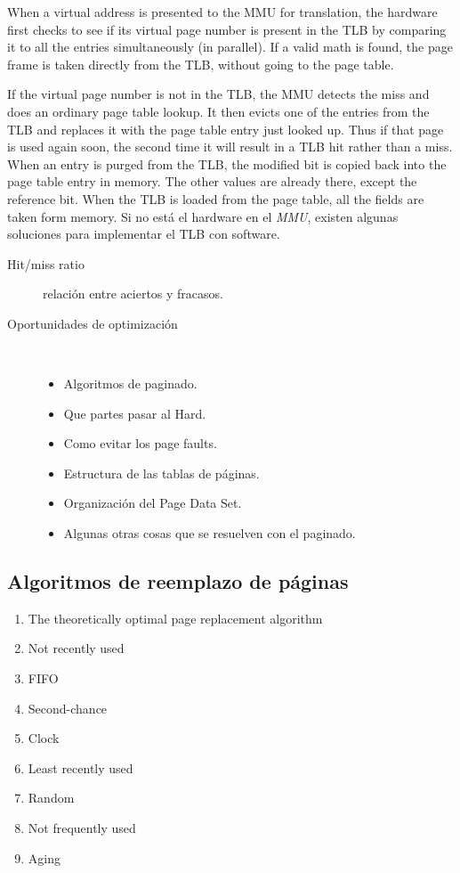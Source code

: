 \documentclass[a4paper, twoside]{article}
\begin{document}
When a virtual address is presented to the MMU for translation, the hardware first checks to see if its virtual page number is present in the TLB by comparing it to all the entries simultaneously (in parallel). If a valid math is found, the page frame is taken directly from the TLB, without going to the page table.

If the virtual page number is not in the TLB, the MMU detects the miss and does an ordinary page table lookup. It then evicts one of the entries from the TLB and replaces it with the page table entry just looked up. Thus if that page is used again soon, the second time it will result in a TLB hit rather than a miss. When an entry is purged from the TLB, the modified bit is copied back into the page table entry in memory. The other values are already there, except the reference bit. When the TLB is loaded from the page table, all the fields are taken form memory.
Si no está el hardware en el \emph{MMU}, existen algunas soluciones para implementar el TLB con software.

\begin{description}
	\item[Hit/miss ratio] relación entre aciertos y fracasos.
	\item[Oportunidades de optimización] ~
	\begin{itemize}
		\item Algoritmos de paginado. 
		\item Que partes pasar al Hard.
		\item Como evitar los page faults.
		\item Estructura de las tablas de páginas.
		\item Organización del Page Data Set.
		\item Algunas otras cosas que se resuelven con el paginado.
	\end{itemize}
\end{description}

\subsection{Algoritmos de reemplazo de páginas}
\begin{enumerate}
	\item The theoretically optimal page replacement algorithm
	\item Not recently used
	\item FIFO
	\item Second-chance
	\item Clock
	\item Least recently used
	\item Random
	\item Not frequently used
	\item Aging
\end{enumerate}
\end{document}
